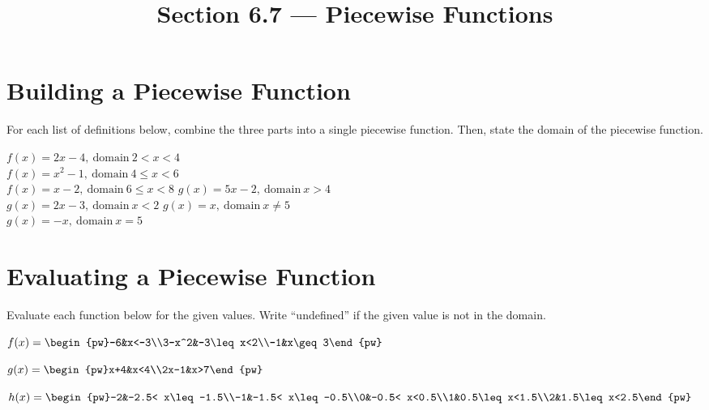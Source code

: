 

\title{Section 6.7 --- Piecewise Functions}

\newcommand{\dpun}{,\ \mathrm{domain}\ }


\maketitle

\section*{Building a Piecewise Function}
For each list of definitions below, combine the three parts into a single piecewise function. Then, state the domain of the piecewise function.
\begin{smenum}
\mitemxx
{$f(x)=2x-4\dpun 2<x<4$\\$f(x)=x^2-1\dpun 4\leq x<6$\\$f(x)=x-2\dpun 6\leq x<8$}
{$g(x)=5x-2\dpun x>4$\\$g(x)=2x-3\dpun x<2$}
\mitemx
{$g(x)=x\dpun x\neq 5$\\$g(x)=-x\dpun x=5$}
\end{smenum}

\section*{Evaluating a Piecewise Function}
Evaluate each function below for the given values. Write ``undefined'' if the given value is not in the domain.
\begin{senum}
\item $f(x)=\begin{pw}-6&x<-3\\3-x^2&-3\leq x<2\\-1&x\geq 3\end{pw}$
\begin{nmenum}
\end{nmenum}
\item $g(x)=\begin{pw}x+4&x<4\\2x-1&x>7\end{pw}$
\begin{nmenum}
\end{nmenum}
\item $h(x)=\begin{pw}-2&-2.5< x\leq-1.5\\-1&-1.5< x\leq-0.5\\0&-0.5< x<0.5\\1&0.5\leq x<1.5\\2&1.5\leq x<2.5\end{pw}$
\begin{nmenum}
\end{nmenum}
\end{senum}

